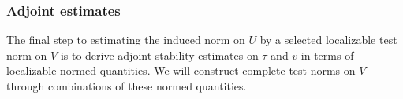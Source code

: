 
\subsubsection{Adjoint estimates}
\label{sec:strategy3}

The final step to estimating the induced norm on $U$ by a selected localizable test norm on $V$ is to derive adjoint stability estimates on $\tau$ and $v$ in terms of localizable normed quantities.  We will construct complete test norms on $V$ through combinations of these normed quantities.%

